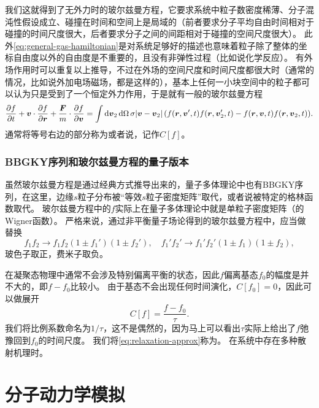 我们这就得到了无外力时的玻尔兹曼方程，它要求系统中粒子数密度稀薄、分子混沌性假设成立、碰撞在时间和空间上是局域的（前者要求分子平均自由时间相对于碰撞的时间尺度很大，后者要求分子之间的间距相对于碰撞的空间尺度很大）。
此外\eqref{eq:general-gas-hamiltonian}是对系统足够好的描述也意味着粒子除了整体的坐标自由度以外的自由度是不重要的，且没有非弹性过程（比如说化学反应）。
有外场作用时可以重复以上推导，不过在外场的空间尺度和时间尺度都很大时（通常的情况，比如说外加电场磁场，都是这样的），基本上任何一小块空间中的粒子都可以认为只是受到了一个恒定外力作用，于是就有一般的玻尔兹曼方程
\begin{equation}
    \pdv{f}{t} + \vb*{v} \cdot \pdv{f}{\vb*{r}} + \frac{\vb*{F}}{m} \cdot \pdv{f}{\vb*{v}} = \int \dd{\vb*{v}_2} \dd{\Omega} \sigma \abs*{\vb*{v}-\vb*{v}_2} (f(\vb*{r}, \vb*{v}', t) f(\vb*{r}, \vb*{v}'_{2}, t) - f(\vb*{r}, \vb*{v}, t) f(\vb*{r}, \vb*{v}_{2}, t)).
    \label{eq:boltzmann-eq-with-force}
\end{equation}
通常将等号右边的部分称为或者说，记作$C[f]$。

\subsubsection{BBGKY序列和玻尔兹曼方程的量子版本}

虽然玻尔兹曼方程是通过经典方式推导出来的，量子多体理论中也有BBGKY序列，在这里，边缘$s$粒子分布被“等效$s$粒子密度矩阵”取代，或者说被特定的格林函数取代。
玻尔兹曼方程中的$f$实际上在量子多体理论中就是单粒子密度矩阵（的Wigner函数）。
严格来说，通过非平衡量子场论得到的玻尔兹曼方程中，应当做替换
\begin{equation}
    f_1 f_2 \longrightarrow f_1 f_2 (1 \pm f_1') (1 \pm f_2'), \quad f_1' f_2' \longrightarrow f_1' f_2' (1 \pm f_1) (1 \pm f_2),
\end{equation}
玻色子取正，费米子取负。

在凝聚态物理中通常不会涉及特别偏离平衡的状态，因此$f$偏离基态$f_0$的幅度是并不大的，即$f - f_0$比较小。
由于基态不会出现任何时间演化，$C[f_0] = 0$，因此可以做展开
\begin{equation}
    C[f] = \frac{f - f_0}{\tau}.
    \label{eq:relaxation-approx}
\end{equation}
我们将比例系数命名为$1 / \tau$，这不是偶然的，因为马上可以看出$\tau$实际上给出了$f$弛豫回到$f_0$的时间尺度。
我们将\eqref{eq:relaxation-approx}称为。
在系统中存在多种散射机理时。%

\section{分子动力学模拟}